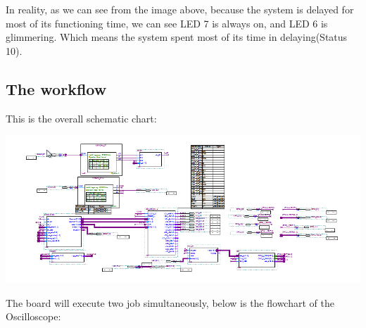 \documentclass[11pt]{scrartcl}
\begin{document}
\begin{itemize}
    In reality, as we can see from the image above, because the system is delayed for most of its functioning time, we can see LED 7 is always on, and LED 6 is glimmering. Which means the system spent most of its time in delaying(Status 10).
    
      
\end{itemize}

\subsection{The workflow}

This is the overall schematic chart:
\begin{center}
\begin{minipage}[t]{\linewidth}

{
\includegraphics[scale = 0.5]{schematic.png}
}
\end{minipage}
\medskip
\end{center}

The board will execute two job simultaneously, below is the flowchart of the Oscilloscope:
\end{document}
